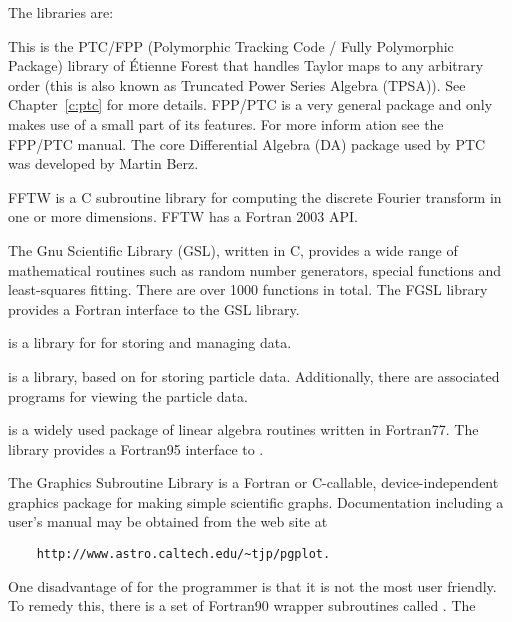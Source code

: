 {{{{{{The  libraries are:
\begin{description}
  \item[forest] \Newline
This is the PTC/FPP (Polymorphic Tracking Code / Fully Polymorphic
Package) library of \'Etienne Forest that handles Taylor maps to any
arbitrary order (this is also known as Truncated Power Series Algebra
(TPSA)). See Chapter~\ref{c:ptc} for more details.  FPP/PTC is a
very general package and \bmad only makes use of a small part of its
features.  For more inform
ation see the FPP/PTC
manual\cite{b:ptc}. The core Differential Algebra (DA) package used
by PTC was developed by Martin Berz\cite{b:berz}.
  \item[fftw] \Newline
FFTW is a C subroutine library for computing the discrete Fourier
transform in one or more dimensions. FFTW has a Fortran 2003 API.
  \item[gsl / fgsl] \Newline
The Gnu Scientific Library (GSL), written in C, provides a wide range of mathematical
routines such as random number generators, special functions and least-squares
fitting. There are over 1000 functions in total. The FGSL library provides a Fortran
interface to the GSL library.
  \item[hdf5] \Newline
{} is a library for for storing and managing data.
  \item[h5hut] \Newline
{} is a library, based on  for storing particle data. Additionally,
there are associated programs for viewing the particle data.
  \item[lapack / lapack95] \Newline
{} is a widely used package of linear algebra routines written in Fortran77. The
 library provides a Fortran95 interface to .
  \item[PGPLOT] \Newline
The  Graphics Subroutine Library is a Fortran or
C-callable, device-independent graphics package for making simple
scientific graphs. Documentation including a user's manual may be
obtained from the  web site at
\begin{verbatim}
    http://www.astro.caltech.edu/~tjp/pgplot.
\end{verbatim} 
One disadvantage of  for the programmer is that it is not the
most user friendly. To remedy this, there is a set of Fortran90
wrapper subroutines called .  The 

\end{description}}}}}}}
